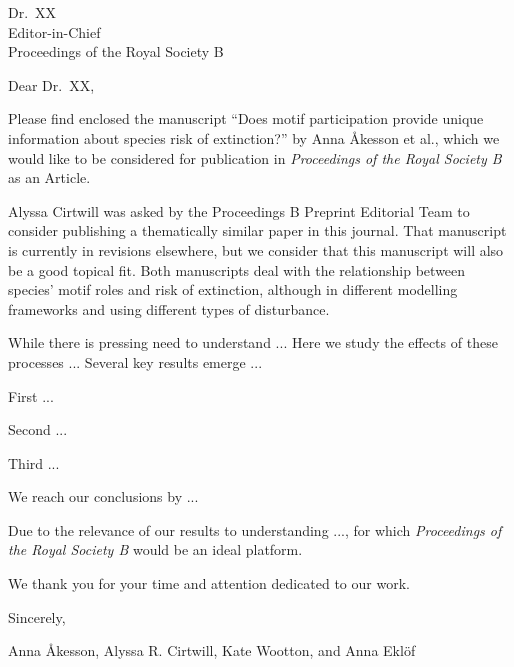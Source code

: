 \documentclass[11pt]{letter}
\date{October XX, 2021}
\begin{document}
\begin{letter}{
\vspace{-2.5cm}

Dr.~XX\\
Editor-in-Chief\\
Proceedings of the Royal Society B} %


\opening{Dear Dr.~XX,}

Please find enclosed the manuscript ``Does motif participation provide unique information about species risk of extinction?'' by Anna {\AA}kesson et al., which we would like to be considered for publication in \emph{Proceedings of the Royal Society B} as an Article.

Alyssa Cirtwill was asked by the Proceedings B Preprint Editorial Team to consider publishing a thematically similar paper in this journal. That manuscript is currently in revisions elsewhere, but we consider that this manuscript will also be a good topical fit. Both manuscripts deal with the relationship between species' motif roles and risk of extinction, although in different modelling frameworks and using different types of disturbance.

While there is pressing need to understand ...
Here we study the effects of these processes ... 
Several key results emerge ...

First ...

Second ...

Third ...

We reach our conclusions by ...

Due to the relevance of our results to understanding ..., for which \emph{ Proceedings of the Royal Society B} would be an ideal platform.

We thank you for your time and attention dedicated to our work.


\vspace{2\parskip}

\hspace{4\parskip} Sincerely,

\hspace{4\parskip} Anna {\AA}kesson, Alyssa R. Cirtwill, Kate Wootton, and Anna Ekl\"of


\end{letter} 
\end{document}
